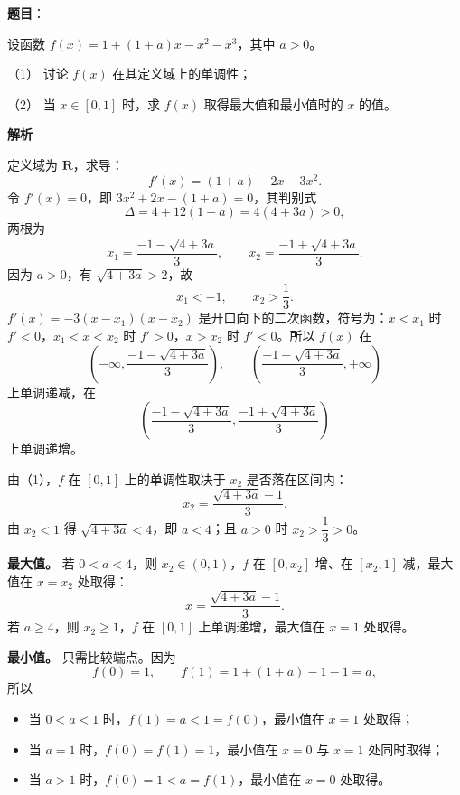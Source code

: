 \begin{answer}

\textbf{题目}：

设函数 $f(x)=1+(1+a)x-x^2-x^3$，其中 $a>0$。

（1） 讨论 $f(x)$ 在其定义域上的单调性；

（2） 当 $x\in[0,1]$ 时，求 $f(x)$ 取得最大值和最小值时的 $x$ 的值。

\textbf{解析}


定义域为 $\mathbf R$，求导：
\nopagebreak[4]
\[f'(x)=(1+a)-2x-3x^2 .\]
令 $f'(x)=0$，即 $3x^2+2x-(1+a)=0$，其判别式
\nopagebreak[4]
\[\Delta=4+12(1+a)=4(4+3a)>0,\]
两根为
\nopagebreak[4]
\[x_1=\frac{-1-\sqrt{4+3a}}3,\qquad x_2=\frac{-1+\sqrt{4+3a}}3 .\]
因为 $a>0$，有 $\sqrt{4+3a}>2$，故
\nopagebreak[4]
\[x_1<-1,\qquad x_2>\frac13 .\]
$f'(x)=-3(x-x_1)(x-x_2)$ 是开口向下的二次函数，符号为：$x<x_1$ 时 $f'<0$，$x_1<x<x_2$ 时 $f'>0$，$x>x_2$ 时 $f'<0$。所以 $f(x)$ 在
\nopagebreak[4]
\[\left(-\infty,\frac{-1-\sqrt{4+3a}}3\right),\qquad
\left(\frac{-1+\sqrt{4+3a}}3,+\infty\right)\]
上单调递减，在
\nopagebreak[4]
\[\left(\frac{-1-\sqrt{4+3a}}3,\frac{-1+\sqrt{4+3a}}3\right)\]
上单调递增。


由（1），$f$ 在 $[0,1]$ 上的单调性取决于 $x_2$ 是否落在区间内：
\nopagebreak[4]
\[x_2=\frac{\sqrt{4+3a}-1}3 .\]
由 $x_2<1$ 得 $\sqrt{4+3a}<4$，即 $a<4$；且 $a>0$ 时 $x_2>\dfrac13>0$。

\textbf{最大值。} 若 $0<a<4$，则 $x_2\in(0,1)$，$f$ 在 $[0,x_2]$ 增、在 $[x_2,1]$ 减，最大值在 $x=x_2$ 处取得：
\nopagebreak[4]
\[x=\frac{\sqrt{4+3a}-1}3 .\]
若 $a\geqslant4$，则 $x_2\geqslant1$，$f$ 在 $[0,1]$ 上单调递增，最大值在 $x=1$ 处取得。

\textbf{最小值。} 只需比较端点。因为
\nopagebreak[4]
\[f(0)=1,\qquad f(1)=1+(1+a)-1-1=a,\]
所以

\begin{itemize}
\item 当 $0<a<1$ 时，$f(1)=a<1=f(0)$，最小值在 $x=1$ 处取得；
\item 当 $a=1$ 时，$f(0)=f(1)=1$，最小值在 $x=0$ 与 $x=1$ 处同时取得；
\item 当 $a>1$ 时，$f(0)=1<a=f(1)$，最小值在 $x=0$ 处取得。
\end{itemize}


\end{answer}
